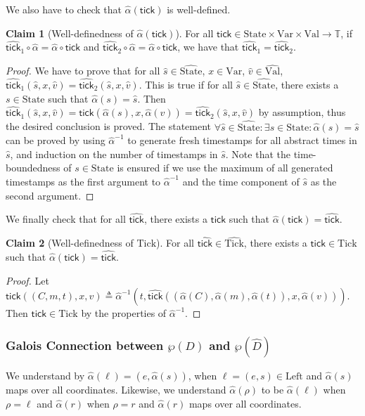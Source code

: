 \documentclass{article}
\theoremstyle{definition}
\newtheorem{clm}{Claim}[section]
\newcommand*{\A}[1]{\widehat{#1}}
\newcommand*{\ExprVar}{\text{Var}}
\newcommand*{\Time}{\mathbb{T}}
\newcommand*{\Value}{\text{Val}}
\newcommand*{\Left}{\text{Left}}
\newcommand*{\mem}{m}
\newcommand*{\State}{\text{State}}
\newcommand*{\Tick}{\text{Tick}}
\newcommand*{\tick}{\mathsf{tick}}
\begin{document}
We also have to check that $\widehat{\alpha}(\tick)$ is well-defined.

\begin{clm}[Well-definedness of $\widehat{\alpha}(\tick)$]
  For all $\tick\in\State\times\ExprVar\times\Value\rightarrow\Time$, if $\widehat{\tick}_1\circ\widehat{\alpha}=\widehat{\alpha}\circ\tick$ and $\widehat{\tick}_2\circ\widehat{\alpha}=\widehat{\alpha}\circ\tick$, we have that $\A\tick_1=\A\tick_2$.
\end{clm}
\begin{proof}
  We have to prove that for all $\A{s}\in\A\State$, $x\in\ExprVar$, $\A{v}\in\A\Value$, $\A\tick_1(\A{s},x,\A{v})=\A\tick_2(\A{s},x,\A{v})$.
  This is true if for all $\A{s}\in\A\State$, there exists a $s\in\State$ such that $\A\alpha(s)=\A{s}$.
  Then $\A\tick_1(\A{s},x,\A{v})=\tick(\A\alpha(s),x,\A\alpha(v))=\A\tick_2(\A{s},x,\A{v})$ by assumption, thus the desired conclusion is proved.
  The statement $\forall\A{s}\in\A\State:\exists s\in\State:\A\alpha(s)=\A{s}$ can be proved by using $\A\alpha^{-1}$ to generate fresh timestamps for all abstract times in $\A{s}$, and induction on the number of timestamps in $\A{s}$.
  Note that the time-boundedness of $s\in\State$ is ensured if we use the maximum of all generated timestamps as the first argument to $\A\alpha^{-1}$ and the time component of $\A{s}$ as the second argument.
\end{proof}

We finally check that for all $\A\tick$, there exists a $\tick$ such that $\A\alpha(\tick)=\A\tick$.

\begin{clm}[Well-definedness of $\Tick$]
  For all $\A\tick\in\A\Tick$, there exists a $\tick\in\Tick$ such that $\A\alpha(\tick)=\A\tick$.
\end{clm}
\begin{proof}
  Let $\tick((C,\mem,t),x,v)\triangleq\A\alpha^{-1}(t,\A\tick((\A\alpha(C),\A\alpha(m),\A\alpha(t)),x,\A\alpha(v)))$. Then $\tick\in\Tick$ by the properties of $\A\alpha^{-1}$.
\end{proof}

\subsubsection{Galois Connection between $\wp(D)$ and $\wp(\A{D})$}
We understand by $\A\alpha(\ell)=(e,\A\alpha(s))$, when $\ell=(e,s)\in\Left$ and $\A\alpha(s)$ maps over all coordinates.
Likewise, we understand $\A\alpha(\rho)$ to be $\A\alpha(\ell)$ when $\rho=\ell$ and $\A\alpha(r)$ when $\rho=r$ and $\A\alpha(r)$ maps over all coordinates.
\end{document}
